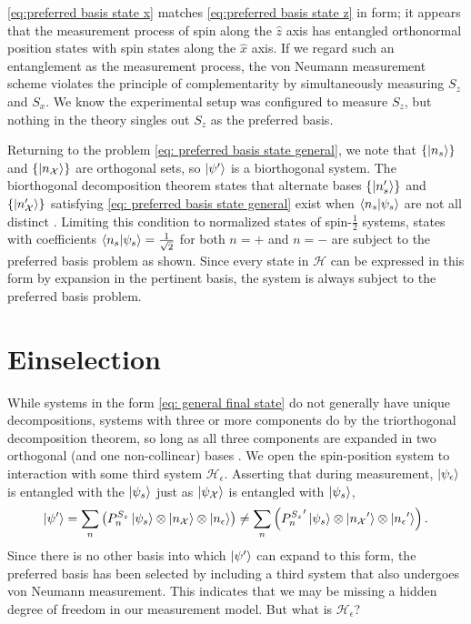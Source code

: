 \autoref{eq:preferred basis state x} matches \autoref{eq:preferred basis state z} in form; it appears that the measurement process of spin along the $\hat{z}$ axis has entangled orthonormal position states with spin states along the $\hat{x}$ axis. If we regard such an entanglement as the measurement process, the von Neumann measurement scheme violates the principle of complementarity by simultaneously measuring $S_z$ and $S_x$. We know the experimental setup was configured to measure $S_z$, but nothing in the theory singles out $S_z$ as the preferred basis.

Returning to the problem \autoref{eq: preferred basis state general}, we note that $\{ \ket{n_s} \}$ and $\{ \ket{n_\mathcal{X}} \}$ are orthogonal sets, so $\ket{\psi'}$ is a biorthogonal system. The biorthogonal decomposition theorem states that alternate bases $\{ \ket{n'_s} \}$ and $\{ \ket{n'_\mathcal{X}} \}$ satisfying \autoref{eq: preferred basis state general} exist when $\braket{n_s | \psi_s}$ are not all distinct \cite{Elby}. Limiting this condition to normalized states of spin-$\frac{1}{2}$ systems, states with coefficients $\braket{n_s | \psi_s} = \frac{1}{\sqrt{2}}$ for both $n = +$ and $n = -$ are subject to the preferred basis problem as shown. Since every state in $\mathcal{H}$ can be expressed in this form by expansion in the pertinent basis, the system is always subject to the preferred basis problem.

\section{Einselection}

While systems in the form \autoref{eq: general final state} do not generally have unique decompositions, systems with three or more components do by the triorthogonal decomposition theorem, so long as all three components are expanded in two orthogonal (and one non-collinear) bases \cite{Elby}. We open the spin-position system to interaction with some third system $\mathcal{H}_\epsilon$. Asserting that during measurement, $\ket{\psi_\epsilon}$ is entangled with the $\ket{\psi_s}$ just as $\ket{\psi_\mathcal{X}}$ is entangled with $\ket{\psi_s}$,
\begin{align} \label{eq:selected basis}
  \ket{\psi'} = \sum_{n}\left(P^{S_z}_n\ket{\psi_s} \otimes \ket{n_\mathcal{X}} \otimes \ket{n_\epsilon} \right) \neq \sum_{n}\left({P^{S_z}_n}'\ket{\psi_s} \otimes \ket{{n_\mathcal{X}}'} \otimes \ket{{n_\epsilon}'} \right).
\end{align}
Since there is no other basis into which $\ket{\psi'}$ can expand to this form, the preferred basis has been selected by including a third system that also undergoes von Neumann measurement. This indicates that we may be missing a hidden degree of freedom in our measurement model. But what is $\mathcal{H}_\epsilon$?


